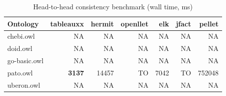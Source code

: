 \begin{table}[t]
\centering
\caption{Head-to-head consistency benchmark (wall time, ms)}
\label{tab:head_to_head_wall_ms}
\begin{tabular}{lrrrrrr}
\toprule
Ontology & tableauxx & hermit & openllet & elk & jfact & pellet \\
\midrule
chebi.owl & NA & NA & NA & NA & NA & NA \\
doid.owl & NA & NA & NA & NA & NA & NA \\
go-basic.owl & NA & NA & NA & NA & NA & NA \\
pato.owl & \textbf{3137} & 14457 & TO & 7042 & TO & 752048 \\
uberon.owl & NA & NA & NA & NA & NA & NA \\
\bottomrule
\end{tabular}
\end{table}
